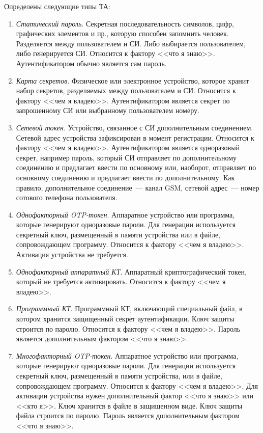 Определены следующие типы ТА:

\begin{enumerate}
\item
{\it Статический пароль}.
Секретная последовательность символов, цифр, графических элементов и пр.,
которую способен запомнить человек.
Разделяется между пользователем и СИ.
Либо выбирается пользователем, либо генерируется СИ.
Относится к фактору <<что я знаю>>. 
Аутентификатором обычно является сам пароль.

\item
{\it Карта секретов}.
Физическое или электронное устройство, которое хранит набор секретов,
разделяемых между пользователем и СИ. Относится к фактору <<чем я владею>>. 
Аутентификатором является секрет по запрошенному СИ или выбранному 
пользователем номеру.

\item
{\it Сетевой токен}.
Устройство, связанное с СИ дополнительным соединением.
Сетевой адрес устройства зафиксирован в момент регистрации.
Относится к фактору <<чем я владею>>. 
%
Аутентификатором является одноразовый секрет, например пароль, который СИ
отправляет по дополнительному соединению и предлагает ввести по основному или,
наоборот, отправляет по основному соединению и предлагает ввести по
дополнительному.
%
Как правило, дополнительное соединение~--- канал GSM, сетевой адрес~--- номер
сотового телефона пользователя.

\item
{\it Однофакторный OTP-токен}.
Аппаратное устройство или программа, которые генерируют одноразовые пароли. Для
генерации используется секретный ключ, размещенный в памяти устройства или в
файле, сопровождающем программу. Относится к фактору <<чем я владею>>. Активация
устройства не требуется.
%

\item
{\it Однофакторный аппаратный КТ}.
Аппаратный криптографический токен, который не требуется активировать.
Относится к фактору <<чем я владею>>. 

\item
{\it Программный КТ}.
Программный КТ, включающий специальный файл, в котором хранится защищенный 
секрет аутентификации. Ключ защиты строится по паролю.
%
Относится к фактору <<чем я владею>>. 
Пароль является дополнительным фактором <<что я знаю>>.

\item
{\it Многофакторный OTP-токен}.
Аппаратное устройство или программа, которые генерируют одноразовые пароли. 
Для генерации используется секретный ключ, размещенный в памяти устройства,
или в файле, сопровождающем программу. 
%
Относится к фактору <<чем я владею>>. 
%
Для активации устройства нужен дополнительный фактор <<что я знаю>> или 
<<кто я>>. 
%
Ключ хранится в файле в защищенном виде. Ключ защиты файла строится по паролю.
Пароль является дополнительным фактором <<что я знаю>>.


\end{enumerate}
